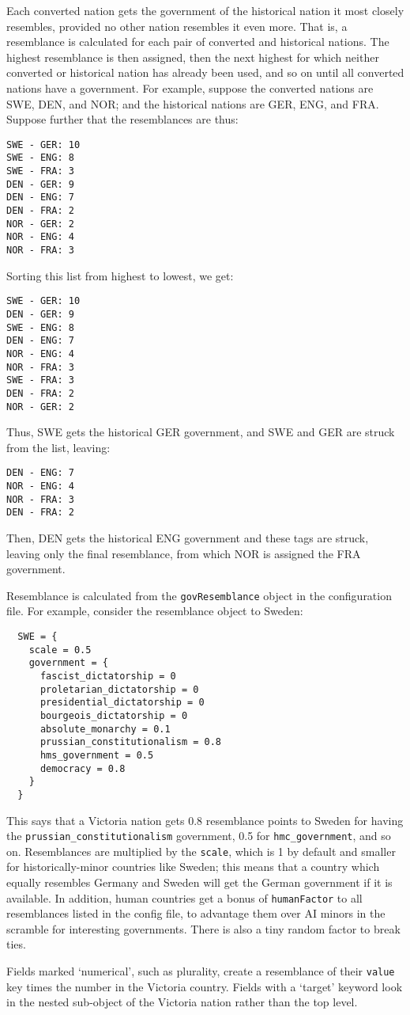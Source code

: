 \documentclass[12pt,ebook,oneside]{book}
\begin{document}
Each converted nation gets the government of the historical nation it
most closely resembles, provided no other nation resembles it even
more. That is, a resemblance is calculated for each pair of converted
and historical nations. The highest resemblance is then assigned, then
the next highest for which neither converted or historical nation has
already been used, and so on until all converted nations have a
government. For example, suppose the converted nations are SWE, DEN,
and NOR; and the historical nations are GER, ENG, and FRA. Suppose
further that the resemblances are thus:
\begin{verbatim}
SWE - GER: 10
SWE - ENG: 8
SWE - FRA: 3
DEN - GER: 9
DEN - ENG: 7
DEN - FRA: 2
NOR - GER: 2
NOR - ENG: 4
NOR - FRA: 3
\end{verbatim}
Sorting this list from highest to lowest, we get:
\begin{verbatim}
SWE - GER: 10
DEN - GER: 9
SWE - ENG: 8
DEN - ENG: 7
NOR - ENG: 4
NOR - FRA: 3
SWE - FRA: 3
DEN - FRA: 2
NOR - GER: 2
\end{verbatim}
Thus, SWE gets the historical GER government, and SWE and GER are
struck from the list, leaving:
\begin{verbatim}
DEN - ENG: 7
NOR - ENG: 4
NOR - FRA: 3
DEN - FRA: 2
\end{verbatim}
Then, DEN gets the historical ENG government and these tags are
struck, leaving only the final resemblance, from which NOR is assigned
the FRA government. 

Resemblance is calculated from the \texttt{govResemblance} object in
the configuration file. For example, consider the resemblance object
to Sweden:
\begin{verbatim}
  SWE = {
    scale = 0.5
    government = {
      fascist_dictatorship = 0
      proletarian_dictatorship = 0 
      presidential_dictatorship = 0
      bourgeois_dictatorship = 0
      absolute_monarchy = 0.1
      prussian_constitutionalism = 0.8
      hms_government = 0.5
      democracy = 0.8
    }
  }
\end{verbatim}
This says that a Victoria nation gets 0.8 resemblance points to Sweden for
having the \texttt{prussian\_constitutionalism} government, 0.5 for
\texttt{hmc\_government}, and so on. Resemblances are multiplied by
the \texttt{scale}, which is 1 by default and smaller for
historically-minor countries like Sweden; this means that a country
which equally resembles Germany and Sweden will get the German
government if it is available. In addition, human countries get a
bonus of \texttt{humanFactor} to all resemblances listed in the config
file, to advantage them
over AI minors in the scramble for interesting governments. There is
also a tiny random factor to break ties. 

Fields marked `numerical', such as plurality, create a resemblance of
their \texttt{value} key times the number in the Victoria
country. Fields with a `target' keyword look in the nested sub-object of
the Victoria nation rather than the top level. 
\end{document}
